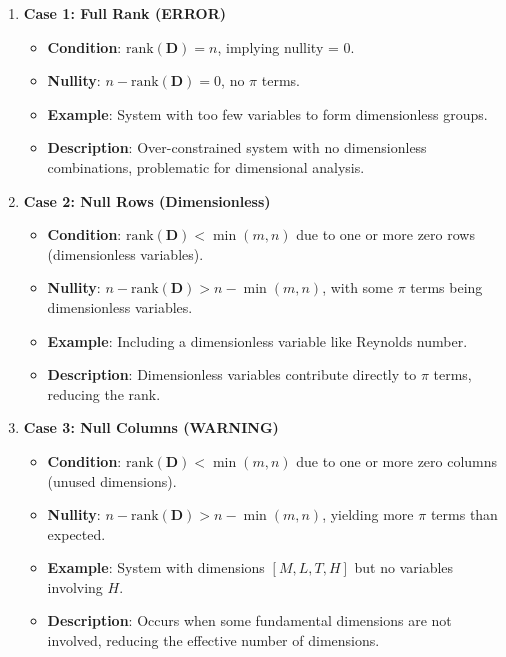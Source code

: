 \begin{enumerate}
    \item \textbf{Case 1: Full Rank (ERROR)}
    \begin{itemize}
        \item \textbf{Condition}: $\text{rank}(\mathbf{D}) = n$, implying nullity = 0.
        \item \textbf{Nullity}: $n - \text{rank}(\mathbf{D}) = 0$, no $\pi$ terms.
        \item \textbf{Example}: System with too few variables to form dimensionless groups.
        \item \textbf{Description}: Over-constrained system with no dimensionless combinations, problematic for dimensional analysis.
    \end{itemize}

  \item \textbf{Case 2: Null Rows (Dimensionless)}
    \begin{itemize}
        \item \textbf{Condition}: $\text{rank}(\mathbf{D}) < \min(m, n)$ due to one or more zero rows (dimensionless variables).
        \item \textbf{Nullity}: $n - \text{rank}(\mathbf{D}) > n - \min(m, n)$, with some $\pi$ terms being dimensionless variables.
        \item \textbf{Example}: Including a dimensionless variable like Reynolds number.
        \item \textbf{Description}: Dimensionless variables contribute directly to $\pi$ terms, reducing the rank.
    \end{itemize}

    \item \textbf{Case 3: Null Columns (WARNING)}
    \begin{itemize}
        \item \textbf{Condition}: $\text{rank}(\mathbf{D}) < \min(m, n)$ due to one or more zero columns (unused dimensions).
        \item \textbf{Nullity}: $n - \text{rank}(\mathbf{D}) > n - \min(m, n)$, yielding more $\pi$ terms than expected.
        \item \textbf{Example}: System with dimensions $[M, L, T, H]$ but no variables involving $H$.
        \item \textbf{Description}: Occurs when some fundamental dimensions are not involved, reducing the effective number of dimensions.
    \end{itemize}


\end{enumerate}
